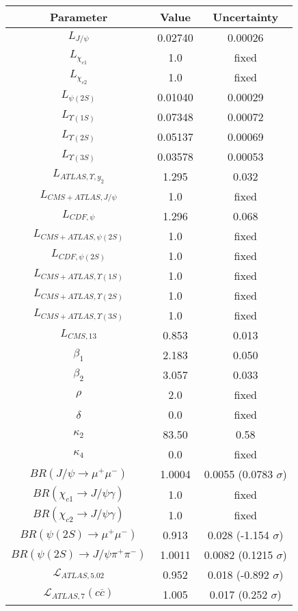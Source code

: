 \begin{table}[h!]
\centering
\begin{tabular}{c|c|c}
Parameter & Value & Uncertainty \\
\hline
$L_{J/\psi}$ & 0.02740 & 0.00026 \\
$L_{\chi_{c1}}$ & 1.0 & fixed \\
$L_{\chi_{c2}}$ & 1.0 & fixed \\
$L_{\psi(2S)}$ & 0.01040 & 0.00029 \\
$L_{\Upsilon(1S)}$ & 0.07348 & 0.00072 \\
$L_{\Upsilon(2S)}$ & 0.05137 & 0.00069 \\
$L_{\Upsilon(3S)}$ & 0.03578 & 0.00053 \\
$L_{ATLAS,\Upsilon,y_2}$ & 1.295 & 0.032 \\
$L_{CMS+ATLAS,J/\psi}$ & 1.0 & fixed \\
$L_{CDF,\psi}$ & 1.296 & 0.068 \\
$L_{CMS+ATLAS,\psi(2S)}$ & 1.0 & fixed \\
$L_{CDF,\psi(2S)}$ & 1.0 & fixed \\
$L_{CMS+ATLAS,\Upsilon(1S)}$ & 1.0 & fixed \\
$L_{CMS+ATLAS,\Upsilon(2S)}$ & 1.0 & fixed \\
$L_{CMS+ATLAS,\Upsilon(3S)}$ & 1.0 & fixed \\
$L_{CMS,13}$ & 0.853 & 0.013 \\
$\beta_1$ & 2.183 & 0.050 \\
$\beta_2$ & 3.057 & 0.033 \\
$\rho$ & 2.0 & fixed \\
$\delta$ & 0.0 & fixed \\
$\kappa_2$ & 83.50 & 0.58 \\
$\kappa_4$ & 0.0 & fixed \\
$BR(J/\psi\rightarrow\mu^+\mu^-)$ & 1.0004 & 0.0055 (0.0783 $\sigma$) \\
$BR(\chi_{c1}\rightarrow J/\psi\gamma)$ & 1.0 & fixed \\
$BR(\chi_{c2}\rightarrow J/\psi\gamma)$ & 1.0 & fixed \\
$BR(\psi(2S)\rightarrow\mu^+\mu^-)$ & 0.913 & 0.028 (-1.154 $\sigma$) \\
$BR(\psi(2S)\rightarrow J/\psi\pi^+\pi^-)$ & 1.0011 & 0.0082 (0.1215 $\sigma$) \\
$\mathcal L_{ATLAS,5.02}$ & 0.952 & 0.018 (-0.892 $\sigma$) \\
$\mathcal L_{ATLAS,7}(c\overline c)$ & 1.005 & 0.017 (0.252 $\sigma$) \\

\end{tabular}
\end{table}

